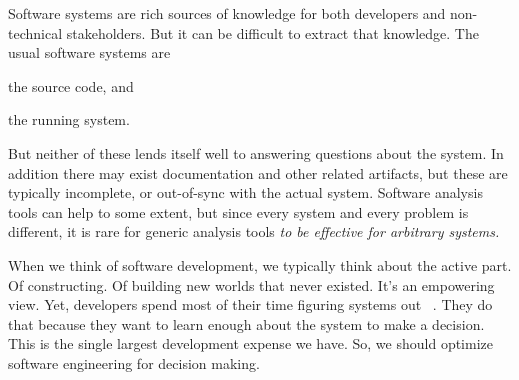 \documentclass[acmsmall,screen,authorversion,nonacm]{acmart} %
\newcommand\tg[1]{\nbc{TG}{#1}{blue}}
\newcommand\cp[1]{\nbe{Cesare}{#1}{olive}} %
\newcommand\ws[1]{\nbe{Workshop}{#1}{teal}} %
\begin{document}

Software systems are rich sources of knowledge for both developers and non-technical stakeholders.
But it can be difficult to extract that knowledge.
The usual  software systems are
\begin{inparaenum}[(i)]
\item the source code, and
\item the running system.
\end{inparaenum}
But neither of these lends itself well to answering questions about the system.
In addition there may exist documentation and other related artifacts, but these are typically incomplete, or out-of-sync with the actual system.
Software analysis tools can help to some extent, but since every system and every problem is different, it is rare for generic analysis tools \emph{to be effective for arbitrary systems.}

When we think of software development, we typically think about the active part.
Of constructing.
Of building new worlds that never existed.
It's an empowering view.
Yet, developers spend most of their time figuring systems out~\cite{Zelk79b} \tg{I would propose \cite{Xia18a}}.
They do that because they want to learn enough about the system to make a decision.
This is the single largest development expense we have.
So, we should optimize software engineering for decision making.
\end{document}

